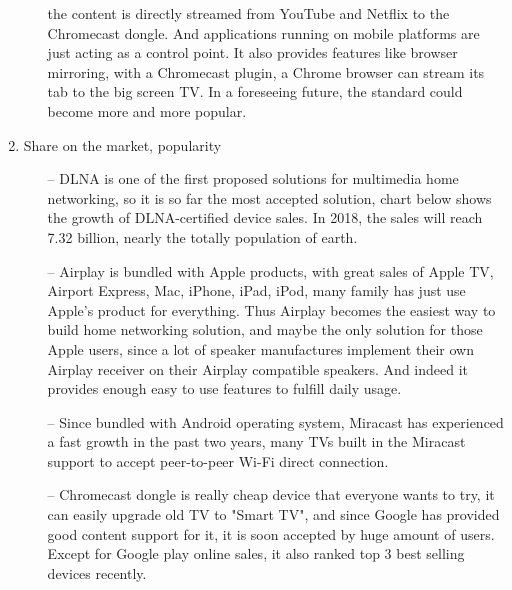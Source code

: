 \begin{enumerate}
\begin{itemize}
the content is directly streamed from YouTube and Netflix to the Chromecast dongle. And applications 
running on mobile platforms are just acting as a control point. It also provides features like 
browser mirroring, with a Chromecast plugin, a Chrome browser can stream its tab to the big screen 
TV. In a foreseeing future, the standard could become more and more popular.
\end{itemize}
\item Share on the market, popularity
\begin{itemize}
\item[--]DLNA is one of the first proposed solutions for multimedia home networking, so it is so 
far the most accepted solution, chart below shows the growth of DLNA-certified device sales. In 
2018, the sales will reach 7.32 billion, nearly the totally population of earth.
\item[--]Airplay is bundled with Apple products, with great sales of Apple TV, Airport Express, 
Mac, iPhone, iPad, iPod, many family has just use Apple's product for everything. Thus Airplay 
becomes the easiest way to build home networking solution, and maybe the only solution for those 
Apple users, since a lot of speaker manufactures implement their own Airplay receiver on their 
Airplay compatible speakers. And indeed it provides enough easy to use features to fulfill daily usage.
\item[--]Since bundled with Android operating system, Miracast has experienced a fast growth in 
the past two years, many TVs built in the Miracast support to accept peer-to-peer Wi-Fi direct connection.
\item[--]Chromecast dongle is really cheap device that everyone wants to try, it can easily upgrade 
old TV to "Smart TV", and since Google has provided good content support for it, it is soon accepted 
by huge amount of users. Except for Google play online sales, it also ranked top 3 best selling devices 
recently.
\end{itemize}
\end{enumerate}


